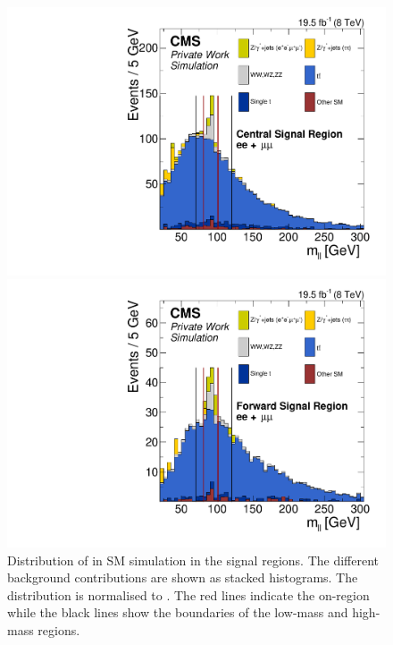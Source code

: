 \begin{figure}[htbp]
\centering
\begin{minipage}[t]{0.49\textwidth}
  \includegraphics[width=\textwidth]{plots/SELECTION/SignalCentral_Mll_Full2012_SF_TopReweighted_MCOnly.pdf}
\end{minipage}
\begin{minipage}[t]{0.49\textwidth}
\includegraphics[width=\textwidth]{plots/SELECTION/SignalForward_Mll_Full2012_SF_TopReweighted_MCOnly.pdf}
\end{minipage}
\caption{Distribution of \mll in SM simulation in the signal regions. The different background contributions are shown as stacked histograms. The distribution is normalised to \lumi. The red lines indicate the on-\Z region while the black lines show the boundaries of the low-mass and high-mass regions.}
\label{fig:sigMC}
\end{figure}

